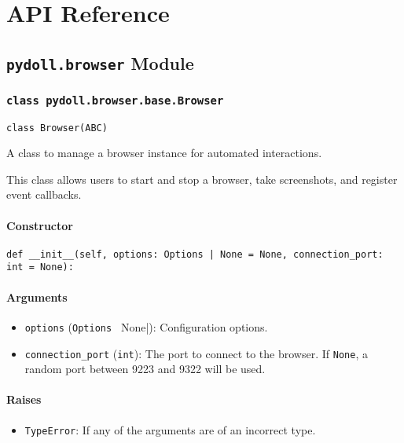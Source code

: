 \documentclass{article}
\begin{document}
\section{API Reference}
\hrulefill

\subsection*{\texttt{pydoll.browser} Module}

\subsubsection*{\texttt{class pydoll.browser.base.Browser}}
\noindent\texttt{class Browser(ABC)}

\noindent A class to manage a browser instance for automated interactions.

\noindent This class allows users to start and stop a browser, take screenshots, and register event callbacks.

\paragraph{Constructor}

\begin{lstlisting}[style=pythonstyle]
def __init__(self, options: Options | None = None, connection_port: int = None):
\end{lstlisting}

\paragraph{Arguments}

\begin{itemize}
    \item \lstinline[style=pythonstyle]|options| (\lstinline[style=pythonstyle]|Options | None|): Configuration options.
    \item \lstinline[style=pythonstyle]|connection_port| (\lstinline[style=pythonstyle]|int|): The port to connect to the browser. If \lstinline[style=pythonstyle]|None|, a random port between 9223 and 9322 will be used.
\end{itemize}

\paragraph{Raises}

\begin{itemize}
    \item \lstinline[style=pythonstyle]|TypeError|: If any of the arguments are of an incorrect type.
\end{itemize}
\end{document}
